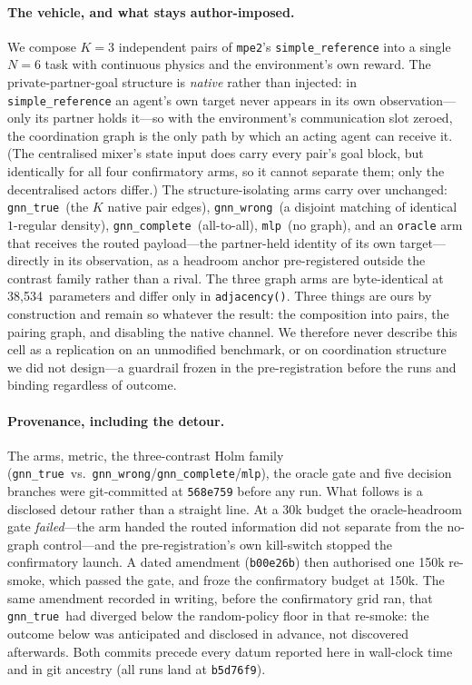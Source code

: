 \documentclass[10pt]{article}
\newcommand{\gtrue}{\texttt{gnn\_true}}
\newcommand{\gwrong}{\texttt{gnn\_wrong}}
\newcommand{\gcomplete}{\texttt{gnn\_complete}}
\newcommand{\mlpc}{\texttt{mlp}}
\newcommand{\PDparams}{38{,}534}       %
\begin{document}
\paragraph{The vehicle, and what stays author-imposed.} We compose $K{=}3$
independent pairs of \texttt{mpe2}'s \texttt{simple\_reference} into a single
$N{=}6$ task with continuous physics and the environment's own reward. The
private-partner-goal structure is \emph{native} rather than injected: in
\texttt{simple\_reference} an agent's own target never appears in its own
observation---only its partner holds it---so with the environment's
communication slot zeroed, the coordination graph is the only path by which an
acting agent can receive it. (The centralised mixer's state input does carry
every pair's goal block, but identically for all four confirmatory arms, so it
cannot separate them; only the decentralised actors differ.) The
structure-isolating arms carry over unchanged: \gtrue\ (the $K$ native pair
edges), \gwrong\ (a disjoint matching of identical $1$-regular density),
\gcomplete\ (all-to-all), \mlpc\ (no graph), and an \texttt{oracle} arm that
receives the routed payload---the partner-held identity of its own
target---directly in its observation, as a headroom anchor pre-registered
outside the contrast family rather than a rival. The three graph arms are byte-identical at
\PDparams\ parameters and differ only in \texttt{adjacency()}. Three things are
ours by construction and remain so whatever the result: the composition into
pairs, the pairing graph, and disabling the native channel. We therefore never
describe this cell as a replication on an unmodified benchmark, or on
coordination structure we did not design---a guardrail frozen in the
pre-registration before the runs and binding regardless of outcome.

\paragraph{Provenance, including the detour.} The arms, metric, the
three-contrast Holm family (\gtrue\ vs.\ \gwrong/\gcomplete/\mlpc), the oracle
gate and five decision branches were git-committed at \texttt{568e759} before
any run. What follows is a disclosed detour rather than a straight line. At a
30k budget the oracle-headroom gate \emph{failed}---the arm handed the routed
information did not separate from the no-graph control---and the
pre-registration's own kill-switch stopped the confirmatory launch. A dated
amendment (\texttt{b00e26b}) then authorised one 150k re-smoke, which passed
the gate, and froze the confirmatory budget at 150k. The same amendment
recorded in writing, before the confirmatory grid ran, that \gtrue\ had
diverged below the random-policy floor in that re-smoke: the outcome below was
anticipated and disclosed in advance, not discovered afterwards. Both commits
precede every datum reported here in wall-clock time and in git ancestry (all
runs land at \texttt{b5d76f9}).
\end{document}
